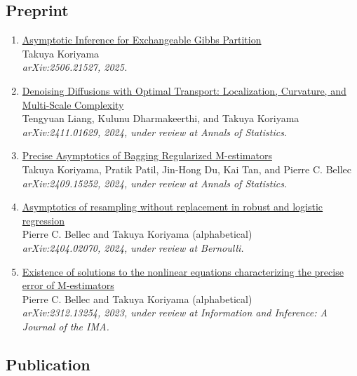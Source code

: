 \documentclass[10pt]{amsart}
\begin{document}
\subsection*{Preprint}
\begin{enumerate}
\item \href{https://arxiv.org/abs/2506.21527}{Asymptotic Inference for Exchangeable Gibbs Partition}\\
Takuya Koriyama\\
\textit{arXiv:2506.21527, 2025.}

\item \href{https://arxiv.org/abs/2411.01629}{Denoising Diffusions with Optimal Transport: Localization, Curvature, and Multi-Scale Complexity}\\
Tengyuan Liang, Kulunu Dharmakeerthi, and Takuya Koriyama \\
\textit{arXiv:2411.01629, 2024, under review at Annals of Statistics.}

\item \href{https://arxiv.org/abs/2409.15252}{Precise Asymptotics of Bagging Regularized M-estimators}\\
Takuya Koriyama, Pratik Patil, Jin-Hong Du, Kai Tan, and Pierre C. Bellec \\
\textit{arXiv:2409.15252, 2024, under review at Annals of Statistics.}

\item \href{https://arxiv.org/abs/2404.02070}{Asymptotics of resampling without replacement in robust and logistic regression}\\
Pierre C. Bellec and Takuya Koriyama (alphabetical)\\
\textit{arXiv:2404.02070, 2024, under review at Bernoulli.}

\item \href{https://arxiv.org/abs/2312.13254}{Existence of solutions to the nonlinear equations characterizing the precise error of M-estimators}\\
Pierre C. Bellec and Takuya Koriyama (alphabetical)\\
\textit{arXiv:2312.13254, 2023, under review at Information and Inference: A Journal of the IMA.}
\end{enumerate}

\subsection*{Publication}
\end{document}
